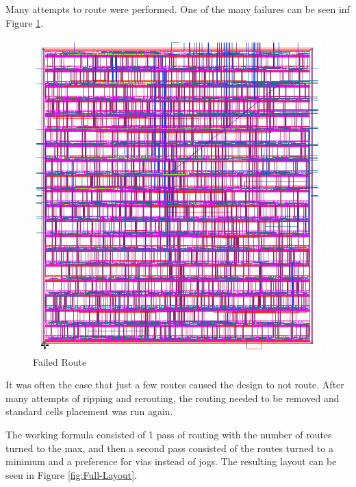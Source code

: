 \documentclass[11pt]{article}
\begin{document}
		Many attempts to route were performed. One of the many failures can be seen inf Figure \ref{fig:Failed-Route}. 
		
		\begin{figure}[H] 
			\centering 
			\includegraphics[width=\textwidth,height=\dimexpr\textheight-4\baselineskip-\abovecaptionskip-\belowcaptionskip\relax,keepaspectratio]{"Pictures/Failed Routing"}
			\caption{Failed Route} 
			\label{fig:Failed-Route} 
		\end{figure}
	
		It was often the case that just a few routes caused the design to not route. After many attempts of ripping and rerouting, the routing needed to be removed and standard cells placement was run again.
	
		The working formula consisted of 1 pass of routing with the number of routes turned to the max, and then a second pass consisted of the routes turned to a minimum and a preference for vias instead of jogs. The resulting layout can be seen in Figure \ref{fig:Full-Layout}.
		
\end{document}
